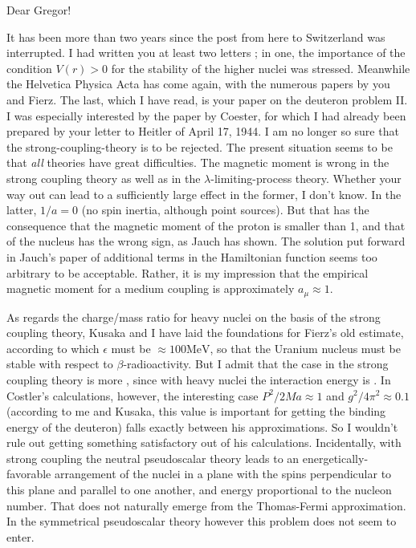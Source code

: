 \date{November 27, 1944}

Dear Gregor!

It has been more than two years since the post from here to Switzerland was interrupted. I had written you at least two letters ; in one, the importance of the condition $V(r)>0$ for the stability of the higher nuclei was stressed. Meanwhile the Helvetica Physica Acta has come again, with the numerous papers by you and Fierz. The last, which I have read, is your paper on the deuteron problem II. I was especially interested by the paper by Coester, for which I had already been prepared by your letter to Heitler of April 17, 1944. I am no longer so sure that the strong-coupling-theory is to be rejected. The present situation seems to be that \textit{all} theories have great difficulties. The magnetic moment is wrong in the strong coupling theory as well as in the $\lambda$-limiting-process theory. Whether your way out can lead to a sufficiently large effect in the former, I don't know. In the latter, $1/a=0$ (no spin inertia, although point sources). But that has the consequence that the magnetic moment of the proton is smaller than 1, and that of the nucleus has the wrong sign, as Jauch has shown. The solution put forward in Jauch's paper of additional terms in the Hamiltonian function seems too arbitrary to be acceptable. Rather, it is my impression that the empirical magnetic moment for a medium coupling is approximately $a_\mu \approx 1$.

As regards the charge/mass ratio for heavy nuclei on the basis of the strong coupling theory, Kusaka and I have laid the foundations for Fierz's old estimate, according to which $\epsilon$ must be $\approx 100\text{MeV}$, so that the Uranium nucleus must be stable with respect to $\beta$-radioactivity. But I admit that the case in the strong coupling theory is more , since with heavy nuclei the interaction energy is . In Costler's calculations, however, the interesting case $P^2/2Ma \approx 1$ and $g^2/4\pi^2 \approx 0.1$ (according to me and Kusaka, this value is important for getting the binding energy of the deuteron) falls exactly between his approximations. So I wouldn't rule out getting something satisfactory out of his calculations. Incidentally, with strong coupling the neutral pseudoscalar theory leads to an energetically-favorable arrangement of the nuclei in a plane with the spins perpendicular to this plane and parallel to one another, and energy proportional to the nucleon number. That does not naturally emerge from the Thomas-Fermi approximation. In the symmetrical pseudoscalar theory however this problem does not seem to enter.

